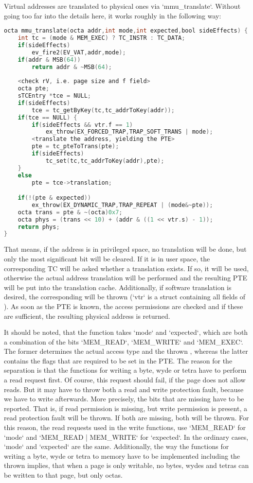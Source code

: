 Virtual addresses are translated to physical ones via `mmu_translate`. Without going too far into the details here, it works roughly in the following way:
\begin{lstlisting}[language=C,caption={Implementation of {\tt mmu\_translate} (partially pseudo-code)}]
octa mmu_translate(octa addr,int mode,int expected,bool sideEffects) {
	int tc = (mode & MEM_EXEC) ? TC_INSTR : TC_DATA;
	if(sideEffects)
		ev_fire2(EV_VAT,addr,mode);
	if(addr & MSB(64))
		return addr & ~MSB(64);
	
	<check rV, i.e. page size and f field>
	octa pte;
	sTCEntry *tce = NULL;
	if(sideEffects)
		tce = tc_getByKey(tc,tc_addrToKey(addr));
	if(tce == NULL) {
		if(sideEffects && vtr.f == 1)
			ex_throw(EX_FORCED_TRAP,TRAP_SOFT_TRANS | mode);
		<translate the address, yielding the PTE>
		pte = tc_pteToTrans(pte);
		if(sideEffects)
			tc_set(tc,tc_addrToKey(addr),pte);
	}
	else
		pte = tce->translation;

	if(!(pte & expected))
		ex_throw(EX_DYNAMIC_TRAP,TRAP_REPEAT | (mode&~pte));
	octa trans = pte & ~(octa)0x7;
	octa phys = (trans << 10) + (addr & ((1 << vtr.s) - 1));
	return phys;
}
\end{lstlisting}
That means, if the address is in privileged space, no translation will be done, but only the most significant bit will be cleared. If it is in user space, the corresponding TC will be asked whether a translation exists. If so, it will be used, otherwise the actual address translation will be performed and the resulting PTE will be put into the translation cache. Additionally, if software translation is desired, the corresponding  will be thrown (`vtr` is a struct containing all fields of ). As soon as the PTE is known, the access permissions are checked and if these are sufficient, the resulting physical address is returned.

It should be noted, that the function takes `mode` and `expected`, which are both a combination of the bits `MEM_READ`, `MEM_WRITE` and `MEM_EXEC`. The former determines the actual access type and the thrown , whereas the latter contains the flags that are required to be set in the PTE. The reason for the separation is that the functions for writing a byte, wyde or tetra have to perform a read request first. Of course, this request should fail, if the page does not allow reads. But it may have to throw both a read and write protection fault, because we have to write afterwards. More precisely, the bits that are missing have to be reported. That is, if read permission is missing, but write permission is present, a read protection fault will be thrown. If both are missing, both will be thrown. For this reason, the read requests used in the write functions, use `MEM_READ` for `mode` and `MEM_READ | MEM_WRITE` for `expected`. In the ordinary cases, `mode` and `expected` are the same. Additionally, the way the functions for writing a byte, wyde or tetra to memory have to be implemented including the thrown  implies, that when a page is only writable, no bytes, wydes and tetras can be written to that page, but only octas.

